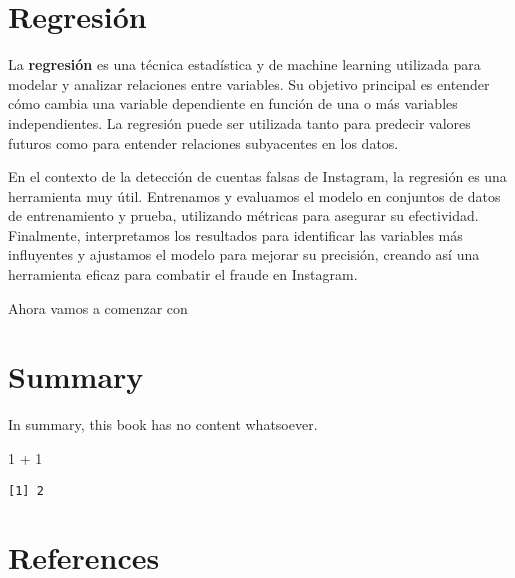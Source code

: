 \documentclass[
  letterpaper,
  DIV=11,
  numbers=noendperiod]{scrreprt}
\newenvironment{Shaded}{\begin{snugshade}}{\end{snugshade}}
\newcommand{\DecValTok}[1]{\textcolor[rgb]{0.68,0.00,0.00}{#1}}
\newcommand{\SpecialCharTok}[1]{\textcolor[rgb]{0.37,0.37,0.37}{#1}}
\newlength{\cslhangindent}
\newenvironment{CSLReferences}[2] %
 {\begin{list}{}{%
  \setlength{\itemindent}{0pt}
  \setlength{\leftmargin}{0pt}
  \setlength{\parsep}{0pt}
  \ifodd #1
   \setlength{\leftmargin}{\cslhangindent}
   \setlength{\itemindent}{-1\cslhangindent}
  \fi
  \setlength{\itemsep}{#2\baselineskip}}}
 {\end{list}}
\begin{document}
\chapter{Regresión}\label{regresiuxf3n}

La \textbf{regresión} es una técnica estadística y de machine learning
utilizada para modelar y analizar relaciones entre variables. Su
objetivo principal es entender cómo cambia una variable dependiente en
función de una o más variables independientes. La regresión puede ser
utilizada tanto para predecir valores futuros como para entender
relaciones subyacentes en los datos.

En el contexto de la detección de cuentas falsas de Instagram, la
regresión es una herramienta muy útil. Entrenamos y evaluamos el modelo
en conjuntos de datos de entrenamiento y prueba, utilizando métricas
para asegurar su efectividad. Finalmente, interpretamos los resultados
para identificar las variables más influyentes y ajustamos el modelo
para mejorar su precisión, creando así una herramienta eficaz para
combatir el fraude en Instagram.

Ahora vamos a comenzar con


\chapter{}\label{section-1}


\chapter{Summary}\label{summary}

In summary, this book has no content whatsoever.

\begin{Shaded}
\begin{Highlighting}[]
\DecValTok{1} \SpecialCharTok{+} \DecValTok{1}
\end{Highlighting}
\end{Shaded}

\begin{verbatim}
[1] 2
\end{verbatim}


\chapter*{References}\label{references}


\label{refs}
\begin{CSLReferences}{0}{1}
\end{CSLReferences}
\end{document}
